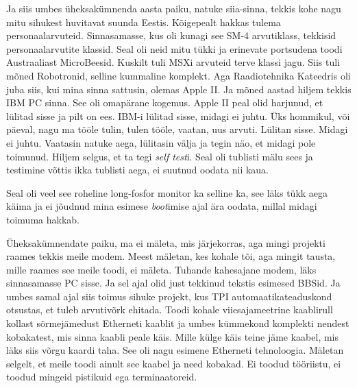 Ja siis umbes üheksakümnenda aasta paiku, natuke siia-sinna, tekkis kohe nagu mitu sihukest huvitavat suunda Eestis. Kõigepealt hakkas tulema personaalarvuteid. Sinnasamasse, kus oli kunagi see SM-4 arvutiklass, tekkisid personaalarvutite klassid. Seal oli  neid mitu tükki ja erinevate portsudena toodi Austraaliast MicroBeesid. Kuskilt tuli MSXi arvuteid terve klassi jagu. Siis tuli mõned Robotronid, selline kummaline komplekt. Aga Raadiotehnika Kateedris oli juba siis, kui mina sinna sattusin, olemas Apple II. Ja mõned aastad hiljem tekkis IBM PC sinna. See oli omapärane kogemus. Apple II peal olid harjunud, et lülitad sisse ja pilt on ees. IBM-i lülitad sisse, midagi ei juhtu. Üks hommikul, või päeval, nagu ma tööle tulin, tulen tööle, vaatan, uus arvuti. Lülitan sisse. Midagi ei juhtu. Vaatasin natuke aega, lülitasin välja ja tegin näo, et midagi pole toimunud. Hiljem selgus, et ta tegi \emph{self test}i. Seal oli tublisti mälu sees ja testimine võttis ikka tublisti aega, ei suutnud oodata nii kaua. 


Seal oli veel see roheline long-fosfor monitor ka selline ka, see läks tükk aega käima ja ei jõudnud mina esimese \emph{boot}imise ajal ära oodata, millal midagi toimuma hakkab.

Üheksakümnendate paiku, ma ei mäleta, mis järjekorras, aga mingi projekti raames tekkis meile modem. Meest mäletan, kes kohale tõi, aga mingit tausta, mille raames see meile toodi, ei mäleta. Tuhande kahesajane modem, läks sinnasamasse PC sisse. Ja sel ajal olid just tekkinud tekstis esimesed BBSid. Ja umbes samal ajal siis toimus sihuke projekt, kus TPI automaatikateaduskond otsustas, et tuleb arvutivõrk ehitada. Toodi kohale viiesajameetrine kaablirull kollast sõrmejämedust Etherneti kaablit ja umbes kümmekond komplekti nendest kobakatest, mis sinna kaabli peale käis. Mille külge käis teine jäme kaabel, mis läks siis võrgu kaardi taha. See oli nagu esimene Etherneti tehnoloogia. Mäletan selgelt, et meile toodi ainult see kaabel ja need kobakad. Ei toodud tööriistu, ei toodud mingeid pistikuid ega terminaatoreid.


